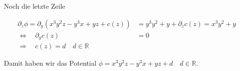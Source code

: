Noch die letzte Zeile

\begin{align*}
\partial_z\phi= \partial_y\left( x^3y^2z-y^3x+yz+c(z)\right)&=y^3y^2+y+\partial_z c(z)=x^3y^2+y\\
\Leftrightarrow \quad \partial_y c(z)&=0\\
\Rightarrow \quad c(z)=d \quad d\in\mathbb{R}
\end{align*}

Damit haben wir das Potential $\phi=x^3y^2z-y^3x+yz+d \quad d\in\mathbb{R}$.
